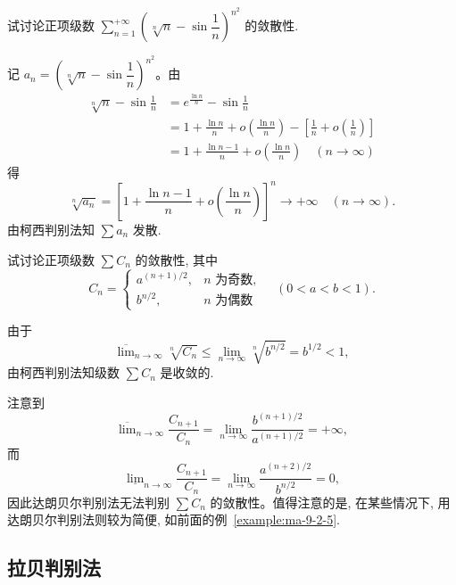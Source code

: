 \begin{example}\label{example:ma-9-2-7}
试讨论正项级数 $\sum\limits_{n=1}^{+\infty}\left(\sqrt[n]{n}-\sin\dfrac1n\right)^{n^2}$ 的敛散性.
\end{example}


\begin{solve}
记 $a_n=\left(\sqrt[n]{n}-\sin\dfrac1n\right)^{n^2}$。由
\[
\begin{aligned}
  \sqrt[n]{n}-\sin\frac1n
  &=e^{\frac{\ln n}{n}}-\sin\frac1n\\
  &=1+\frac{\ln n}{n}+o\left(\frac{\ln n}{n}\right)-\left[\frac1n+o\left(\frac1n\right)\right]\\
  &=1+\frac{\ln n-1}{n}+o\left(\frac{\ln n}{n}\right)\quad(n\to\infty)
\end{aligned}
\]
得
\[
  \sqrt[n]{a_n}=\left[1+\frac{\ln n-1}{n}+o\left(\frac{\ln n}{n}\right)\right]^n\to+\infty\quad(n\to\infty).
\]
由柯西判别法知 $\sum a_n$ 发散.
\end{solve}


\begin{example}\label{example:ma-9-2-8}
试讨论正项级数 $\sum C_n$ 的敛散性, 其中
\[
  C_n=\begin{cases}
    a^{(n+1)/2}, & n\text{ 为奇数},\\
    b^{n/2}, & n\text{ 为偶数}
  \end{cases}\quad(0<a<b<1).
\]
\end{example}


\begin{solve}
由于
\[
  \overline{\lim}_{n\to\infty}\sqrt[n]{C_n}\leq\lim_{n\to\infty}\sqrt[n]{b^{n/2}}=b^{1/2}<1,
\]
由柯西判别法知级数 $\sum C_n$ 是收敛的.
\end{solve}


\begin{remark}\label{remark:ma-9-source-43}
注意到
\[
  \overline{\lim}_{n\to\infty}\frac{C_{n+1}}{C_n}
  =\lim_{n\to\infty}\frac{b^{(n+1)/2}}{a^{(n+1)/2}}=+\infty,
\]
而
\[
  \underline{\lim}_{n\to\infty}\frac{C_{n+1}}{C_n}
  =\lim_{n\to\infty}\frac{a^{(n+2)/2}}{b^{n/2}}=0,
\]
因此达朗贝尔判别法无法判别 $\sum C_n$ 的敛散性。值得注意的是, 在某些情况下, 用达朗贝尔判别法则较为简便, 如前面的例~\ref{example:ma-9-2-5}.
\end{remark}


\subsection{拉贝判别法}
\label{subsec:ma-9-2-3}

